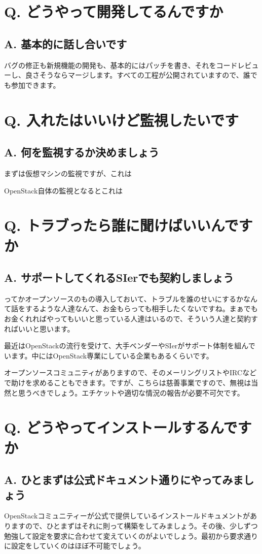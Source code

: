 \documentclass[9pt,b5paper,tombo,openany]{jsbook}
\begin{document}
\section*{Q. どうやって開発してるんですか}
\subsection*{A. 基本的に話し合いです}
バグの修正も新規機能の開発も、基本的にはパッチを書き、それをコードレビューし、良さそうならマージします。すべての工程が公開されていますので、誰でも参加できます。

\section*{Q. 入れたはいいけど監視したいです}
\subsection*{A. 何を監視するか決めましょう}
まずは仮想マシンの監視ですが、これは

OpenStack自体の監視となるとこれは

\section*{Q. トラブったら誰に聞けばいいんですか}
\subsection*{A. サポートしてくれるSIerでも契約しましょう}
ってかオープンソースのもの導入しておいて、トラブルを誰のせいにするかなんて話をするような人達なんて、お金もらっても相手したくないですね。まぁでもお金くれればやってもいいと思っている人達はいるので、そういう人達と契約すればいいと思います。

最近はOpenStackの流行を受けて、大手ベンダーやSIerがサポート体制を組んでいます。中にはOpenStack専業にしている企業もあるくらいです。

オープンソースコミュニティがありますので、そのメーリングリストやIRCなどで助けを求めることもできます。ですが、こちらは慈善事業ですので、無視は当然と思うべきでしょう。エチケットや適切な情況の報告が必要不可欠です。
\section*{Q. どうやってインストールするんですか}
\subsection*{A. ひとまずは公式ドキュメント通りにやってみましょう}
OpenStackコミュニティーが公式で提供しているインストールドキュメントがありますので、ひとまずはそれに則って構築をしてみましょう。その後、少しずつ勉強して設定を要求に合わせて変えていくのがよいでしょう。最初から要求通りに設定をしていくのはほぼ不可能でしょう。
\end{document}
